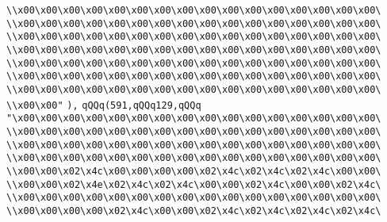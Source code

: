 \verb|\\x00\x00\x00\x00\x00\x00\x00\x00\x00\x00\x00\x00\x00\x00\x00\x00\|\newline
\verb|\\x00\x00\x00\x00\x00\x00\x00\x00\x00\x00\x00\x00\x00\x00\x00\x00\|\newline
\verb|\\x00\x00\x00\x00\x00\x00\x00\x00\x00\x00\x00\x00\x00\x00\x00\x00\|\newline
\verb|\\x00\x00\x00\x00\x00\x00\x00\x00\x00\x00\x00\x00\x00\x00\x00\x00\|\newline
\verb|\\x00\x00\x00\x00\x00\x00\x00\x00\x00\x00\x00\x00\x00\x00\x00\x00\|\newline
\verb|\\x00\x00\x00\x00\x00\x00\x00\x00\x00\x00\x00\x00\x00\x00\x00\x00\|\newline
\verb|\\x00\x00\x00\x00\x00\x00\x00\x00\x00\x00\x00\x00\x00\x00\x00\x00\|\newline
\verb|\\x00\x00"|\newline
\verb|),|\newline
\verb|qQQq(591,qQQq129,qQQq|\newline
\verb|"\x00\x00\x00\x00\x00\x00\x00\x00\x00\x00\x00\x00\x00\x00\x00\x00\|\newline
\verb|\\x00\x00\x00\x00\x00\x00\x00\x00\x00\x00\x00\x00\x00\x00\x00\x00\|\newline
\verb|\\x00\x00\x00\x00\x00\x00\x00\x00\x00\x00\x00\x00\x00\x00\x00\x00\|\newline
\verb|\\x00\x00\x00\x00\x00\x00\x00\x00\x00\x00\x00\x00\x00\x00\x00\x00\|\newline
\verb|\\x00\x00\x02\x4c\x00\x00\x00\x00\x02\x4c\x02\x4c\x02\x4c\x00\x00\|\newline
\verb|\\x00\x00\x02\x4e\x02\x4c\x02\x4c\x00\x00\x02\x4c\x00\x00\x02\x4c\|\newline
\verb|\\x00\x00\x00\x00\x00\x00\x00\x00\x00\x00\x00\x00\x00\x00\x00\x00\|\newline
\verb|\\x00\x00\x00\x00\x02\x4c\x00\x00\x02\x4c\x02\x4c\x02\x4c\x02\x4c\|\newline
